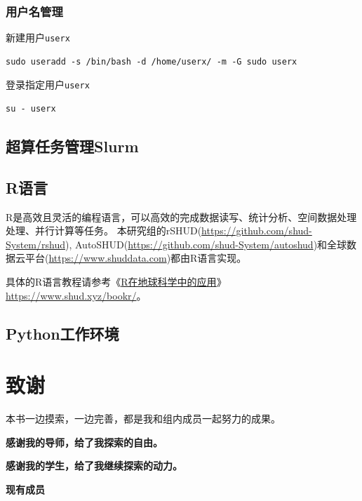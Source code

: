 \documentclass[
]{book}
\begin{document}
\hypertarget{linux-user}{%
\subsection{用户名管理}\label{linux-user}}

新建用户\texttt{userx}

\begin{verbatim}
sudo useradd -s /bin/bash -d /home/userx/ -m -G sudo userx
\end{verbatim}

登录指定用户\texttt{userx}

\begin{verbatim}
su - userx
\end{verbatim}

\hypertarget{slurm}{%
\section{超算任务管理Slurm}\label{slurm}}

\hypertarget{r}{%
\section{R语言}\label{r}}

R是高效且灵活的编程语言，可以高效的完成数据读写、统计分析、空间数据处理处理、并行计算等任务。
本研究组的rSHUD(\url{https://github.com/shud-System/rshud}), AutoSHUD(\url{https://github.com/shud-System/autoshud})和全球数据云平台(\url{https://www.shuddata.com})都由R语言实现。

具体的R语言教程请参考《\href{https://www.shud.xyz/bookr/}{R在地球科学中的应用}》\url{https://www.shud.xyz/bookr/}。

\hypertarget{python}{%
\section{Python工作环境}\label{python}}

\hypertarget{Ack}{%
\chapter{致谢}\label{Ack}}

本书一边摸索，一边完善，都是我和组内成员一起努力的成果。

\textbf{感谢我的导师，给了我探索的自由。}

\textbf{感谢我的学生，给了我继续探索的动力。}

\textbf{现有成员}
\end{document}
